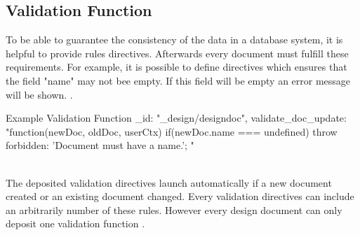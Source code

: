 \subsection{Validation Function}
To be able to guarantee the consistency of the data in a database system, it is helpful to provide rules directives. Afterwards every document must fulfill these requirements. For example, it is possible to define directives which ensures that the field "name" may not bee empty. If this field will be empty an error message will be shown. \parencite{Scheliga.2010}.
\begin{mylisting}{Example Validation Function \parencite{Scheliga.2010}}
{
    _id: "_design/designdoc",
    validate_doc_update: "function(newDoc, oldDoc, userCtx) {
    if(newDoc.name === undefined) {
    throw {forbidden: 'Document must have a name.'};
    }}"
}
\end{mylisting} \\
The deposited validation directives launch automatically if a new document created or an existing document changed. Every validation directives can include an arbitrarily number of these rules. However every design document can only deposit one validation function \parencite{Scheliga.2010}.


